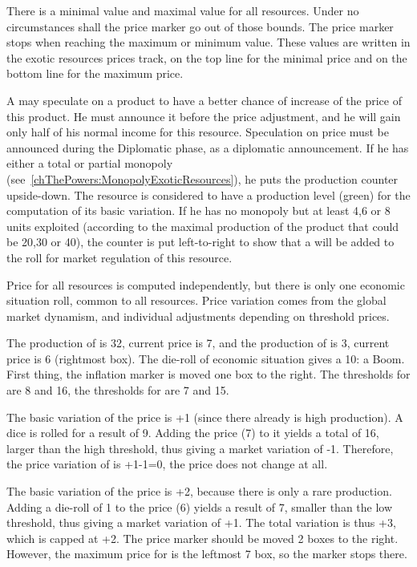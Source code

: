 \aparag There is a minimal value and maximal value for all resources. Under no
circumstances shall the price marker go out of those bounds.
\bparag The price marker stops when reaching the maximum or minimum value.
\bparag These values are written in the exotic resources prices track, on the
top line for the minimal price and on the bottom line for the maximum price.

\aparag[Speculation]\label{chExpenses:Speculation}
A \MAJ may speculate on a product to have a better chance of increase of the
price of this product. He must announce it before the price adjustment, and he
will gain only half of his normal income for this resource.
\bparag Speculation on price must be announced during the Diplomatic phase, as
a diplomatic announcement.
\bparag If he has either a total or partial monopoly
(see~\ref{chThePowers:MonopolyExoticResources}), he puts the production
counter upside-down. The resource is considered to have a 
production level (green) for the computation of its basic variation.
\bparag If he has no monopoly but at least 4,6 or 8 units exploited (according
to the maximal production of the product that could be 20,30 or 40), the
counter is put left-to-right to show that a  will be added to the
roll for market regulation of this resource.

\aparag Price for all resources is computed independently, but there is only
one economic situation roll, common to all resources.
\bparag Price variation comes from the global market dynamism, and individual
adjustments depending on threshold prices.

\begin{exemple}
  The production of  is 32, current price is 7, and the production
  of  is 3, current price is 6 (rightmost box). The die-roll of
  economic situation gives a 10: a Boom. First thing, the inflation marker is
  moved one box to the right. The thresholds for  are 8 and 16, the
  thresholds for  are 7 and 15.

  The basic variation of the  price is +1 (since there already is
  high production). A dice is rolled for a result of 9. Adding the price (7)
  to it yields a total of 16, larger than the high threshold, thus giving a
  market variation of -1. Therefore, the price variation of  is
  +1-1=0, the price does not change at all.

  The basic variation of the  price is +2, because there is only a
  rare production. Adding a die-roll of 1 to the price (6) yields a result of
  7, smaller than the low threshold, thus giving a market variation of +1.
  The total variation is thus +3, which is capped at +2. The price marker
  should be moved 2 boxes to the right. However, the maximum price for
   is the leftmost 7 box, so the marker stops there.
\end{exemple}



